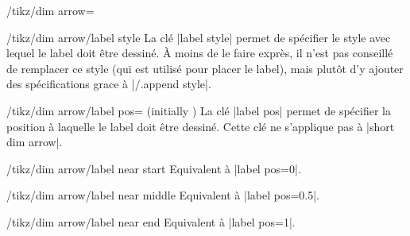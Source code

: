 \documentclass[a4paper]{ltxdoc}
\begin{document}
\begin{stylekey}{/tikz/dim arrow=}
  \begin{stylekey}{/tikz/dim arrow/label style}
  La clé |label style| permet de spécifier le style avec lequel le label doit être dessiné.
  À moins de le faire exprès, il n'est pas conseillé de remplacer ce style (qui est utilisé pour placer le label), mais plutôt d'y ajouter des spécifications grace à |/.append style|.

\begin{codeexample}[]
\end{codeexample}
  \end{stylekey}

  \begin{key}{/tikz/dim arrow/label pos= (initially )}
  La clé |label pos| permet de spécifier la position  à laquelle le label doit être dessiné.
  Cette clé ne s'applique pas à |short dim arrow|.

\begin{codeexample}[]
\end{codeexample}
  \end{key}

  \begin{key}{/tikz/dim arrow/label near start}
  Equivalent à |label pos=0|.
  \end{key}

  \begin{key}{/tikz/dim arrow/label near middle}
  Equivalent à |label pos=0.5|.
  \end{key}

  \begin{key}{/tikz/dim arrow/label near end}
  Equivalent à |label pos=1|.
  \end{key}


\end{stylekey}
\end{document}
